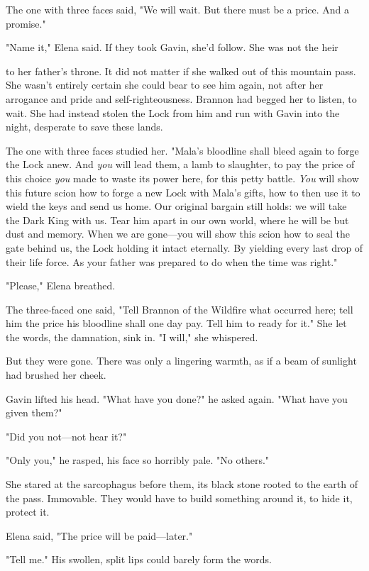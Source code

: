 The one with three faces said, "We will wait. But there must be a price. And a promise."

"Name it," Elena said. If they took Gavin, she'd follow. She was not the heir

to her father's throne. It did not matter if she walked out of this mountain pass. She wasn't entirely certain she could bear to see him again, not after her arrogance and pride and self-righteousness. Brannon had begged her to listen, to wait. She had instead stolen the Lock from him and run with Gavin into the night, desperate to save these lands.

The one with three faces studied her. "Mala's bloodline shall bleed again to forge the Lock anew. And \emph{you} will lead them, a lamb to slaughter, to pay the price of this choice \emph{you} made to waste its power here, for this petty battle. \emph{You} will show this future scion how to forge a new Lock with Mala's gifts, how to then use it to wield the keys and send us home. Our original bargain still holds: we will take the Dark King with us. Tear him apart in our own world, where he will be but dust and memory. When we are gone---you will show this scion how to seal the gate behind us, the Lock holding it intact eternally. By yielding every last drop of their life force. As your father was prepared to do when the time was right."

"Please," Elena breathed.

The three-faced one said, "Tell Brannon of the Wildfire what occurred here; tell him the price his bloodline shall one day pay. Tell him to ready for it." She let the words, the damnation, sink in. "I will," she whispered.

But they were gone. There was only a lingering warmth, as if a beam of sunlight had brushed her cheek.

Gavin lifted his head. "What have you done?" he asked again. "What have you given them?"

"Did you not---not hear it?"

"Only you," he rasped, his face so horribly pale. "No others."

She stared at the sarcophagus before them, its black stone rooted to the earth of the pass. Immovable. They would have to build something around it, to hide it, protect it.

Elena said, "The price will be paid---later."

"Tell me." His swollen, split lips could barely form the words.

